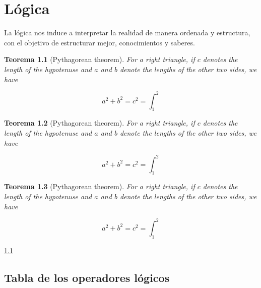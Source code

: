 \documentclass[
  16pt,
]{krantz}
\newtheorem{theorem}{Teorema}[chapter]
\theoremstyle{definition}
\theoremstyle{definition}
\theoremstyle{definition}
\theoremstyle{definition}
\theoremstyle{remark}
\begin{document}
\mainmatter

\hypertarget{luxf3gica}{%
\chapter{Lógica}\label{luxf3gica}}

La lógica nos induce a interpretar la realidad de manera ordenada y estructura, con el objetivo de estructurar mejor, conocimientos y saberes.

\begin{theorem}[Pythagorean theorem]
\protect\hypertarget{thm:pyth}{}\label{thm:pyth}For a right triangle, if \(c\) denotes the length of the hypotenuse
and \(a\) and \(b\) denote the lengths of the other two sides, we have

\[a^2 + b^2 = c^2=\int_1^2\]
\end{theorem}

\citet{vincze2014college}

\begin{theorem}[Pythagorean theorem]
\protect\hypertarget{thm:pyth1}{}\label{thm:pyth1}For a right triangle, if \(c\) denotes the length of the hypotenuse
and \(a\) and \(b\) denote the lengths of the other two sides, we have

\[a^2 + b^2 = c^2=\int_1^2\]
\end{theorem}

\citet{vincze2014college}

\begin{theorem}[Pythagorean theorem]
\protect\hypertarget{thm:pyth2}{}\label{thm:pyth2}For a right triangle, if \(c\) denotes the length of the hypotenuse
and \(a\) and \(b\) denote the lengths of the other two sides, we have

\[a^2 + b^2 = c^2=\int_1^2\]
\end{theorem}

\citet{vincze2014college}

\ref{thm:pyth}

\hypertarget{tabla-de-los-operadores-luxf3gicos}{%
\section{Tabla de los operadores lógicos}\label{tabla-de-los-operadores-luxf3gicos}}
\end{document}
